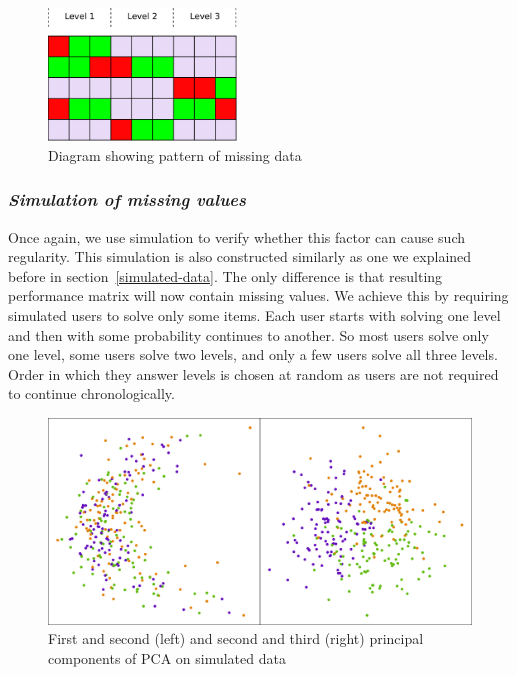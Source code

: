\documentclass[
  printed, %
  table,   %
  nolof,     %
  nolot,     %
  color,
  final,
  nocover
]{fithesis3}
\begin{document}
\begin{figure}
  \includegraphics[width=5cm]{img/missing_pattern_diagram}
  \caption{Diagram showing pattern of missing data}
  \label{fig:missing_pattern_diagram}
\end{figure}


\subsubsection{\textit{Simulation of missing values}}\label{simulation-of-missing-values}

Once again, we use simulation to verify whether this factor can cause such regularity. This simulation is also constructed similarly as one we explained before in section~\ref{simulated-data}. The only difference is that resulting performance matrix will now contain missing values. We achieve this by requiring simulated users to solve only some items. Each user starts with solving one level and then with some probability continues to another. So most users solve only one level, some users solve two levels, and only a few users solve all three levels. Order in which they answer levels is chosen at random as users are not required to continue chronologically.

\begin{figure}
  \includegraphics[width=\textwidth]{img/simulated_missing}
  \caption{First and second (left) and second and third (right) principal components of PCA on simulated data}
  \label{fig:simulated_missing}
\end{figure}
\end{document}
